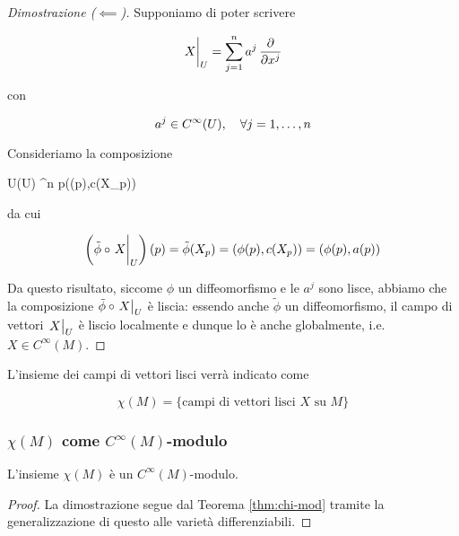 \begin{proof}[Dimostrazione ($ \impliedby $)]
	Supponiamo di poter scrivere
	
	\begin{equation}
		\eval{X}_{U} = \sum_{j=1}^{n} a^{j} \, \pdv{x^{j}}
	\end{equation}
	
	con
	
	\begin{equation}
		a^{j} \in C^{\infty}(U) \qcomma \forall j=1,\dots,n
	\end{equation}

	Consideriamo la composizione
	
		{U}{\phi(U) \times \R^{n}}
		{p}{(\phi(p),c(X_{p}))}

	da cui
	
	\begin{equation}
		\left( \tilde{\phi} \circ \eval{X}_{U} \right)(p) = \tilde{\phi}(X_{p}) %
		= (\phi(p),c(X_{p})) %
		= (\phi(p),a(p))
	\end{equation}

	Da questo risultato, siccome $ \phi $  un diffeomorfismo e le $ a^{j} $ sono lisce, abbiamo che la composizione $ \tilde{\phi} \circ \eval{X}_{U} $ è liscia: essendo anche $ \tilde{\phi} $ un diffeomorfismo, il campo di vettori $ \eval{X}_{U} $ è liscio localmente e dunque lo è anche globalmente, i.e. $ X \in C^{\infty}(M) $.
\end{proof}

L'insieme dei campi di vettori lisci verrà indicato come

\begin{equation}
	\chi(M) = \{ \text{campi di vettori lisci } X \text{ su } M \}
\end{equation}

\subsubsection{$ \chi(M) $ come $ C^{\infty}(M) $-modulo}

\begin{definition}
	L'insieme $ \chi(M) $ è un $ C^{\infty}(M) $-modulo.
\end{definition}

\begin{proof}
	La dimostrazione segue dal Teorema \ref{thm:chi-mod} tramite la generalizzazione di questo alle varietà differenziabili.
\end{proof}

